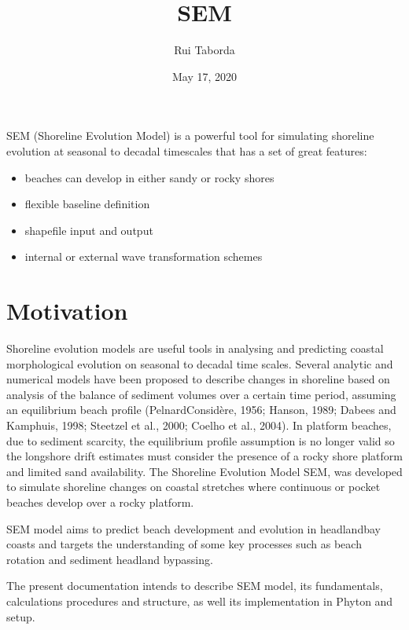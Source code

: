 \documentclass[letterpaper,10pt,english]{sphinxmanual}
\title{SEM}
\date{May 17, 2020}
\author{Rui Taborda}
\begin{document}
\pagestyle{empty}
\sphinxmaketitle
\pagestyle{plain}
\sphinxtableofcontents
\pagestyle{normal}
\label{\detokenize{index::doc}}
\noindent{}



SEM (Shoreline Evolution Model) is a powerful tool for simulating shoreline evolution at seasonal to decadal timescales that has a set of great features:
\begin{itemize}
\item {} 
beaches can develop in either sandy or rocky shores

\item {} 
flexible baseline definition

\item {} 
shapefile input and output

\item {} 
internal or external wave transformation schemes

\end{itemize}


\chapter{Motivation}
\label{\detokenize{docs/motivation:motivation}}\label{\detokenize{docs/motivation::doc}}
Shoreline evolution models are useful tools in analysing and predicting coastal morphological
evolution on seasonal to decadal time scales. Several analytic and numerical models have been
proposed to describe changes in shoreline based on analysis of the balance of sediment volumes
over a certain time period, assuming an equilibrium beach profile (Pelnard\sphinxhyphen{}Considère, 1956; Hanson, 1989; Dabees and Kamphuis, 1998; Steetzel et al., 2000; Coelho et al., 2004).
In platform beaches, due to sediment scarcity, the equilibrium profile assumption is no longer valid so the longshore drift
estimates must consider the presence of a rocky shore platform and  limited sand availability.
The Shoreline Evolution Model\textendash{} SEM, was developed to simulate shoreline changes on coastal stretches
where continuous or pocket beaches develop over a rocky platform.

SEM model aims to predict beach development and evolution in headland\sphinxhyphen{}bay coasts
and targets the understanding of some key processes such as beach rotation and sediment headland bypassing.

The present documentation intends to describe SEM model, its fundamentals, calculations procedures and structure, as well its implementation in Phyton and setup.
\end{document}
